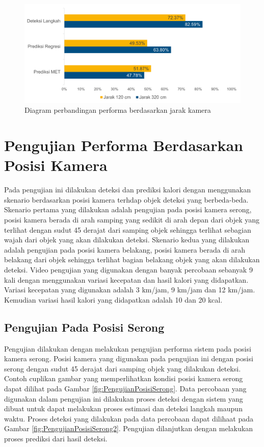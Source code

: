 \begin{figure}[H]
  \centering
  \includegraphics[scale=0.7]{gambar/diagram_jarak.png}
  \caption{Diagram perbandingan performa berdasarkan jarak kamera}
  \label{fig:DiagramJarak}
\end{figure}

\section{Pengujian Performa Berdasarkan Posisi Kamera}
\label{sec:PengujianPosisi}

Pada pengujian ini dilakukan deteksi dan prediksi kalori dengan menggunakan skenario berdasarkan posisi kamera terhdap objek deteksi yang berbeda-beda. Skenario pertama yang dilakukan adalah pengujian pada posisi kamera serong, posisi kamera berada di arah samping yang sedikit di arah depan dari objek yang terlihat dengan sudut 45 derajat dari samping objek sehingga terlihat sebagian wajah dari objek yang akan dilakukan deteksi. Skenario kedua yang dilakukan adalah pengujian pada posisi kamera belakang, posisi kamera berada di arah belakang dari objek sehingga terlihat bagian belakang objek yang akan dilakukan deteksi. Video pengujian yang digunakan dengan banyak percobaan sebanyak 9 kali dengan menggunakan variasi kecepatan dan hasil kalori yang didapatkan. Variasi kecepatan yang digunakan adalah 3 km/jam, 9 km/jam dan 12 km/jam. Kemudian variasi hasil kalori yang didapatkan adalah 10 dan 20 kcal. 


\subsection{Pengujian Pada Posisi Serong}
\label{subsec:PengujianPosisiSerong}

Pengujian dilakukan dengan melakukan pengujian performa sistem pada posisi kamera serong. Posisi kamera yang digunakan pada pengujian ini dengan posisi serong dengan sudut 45 derajat dari samping objek yang dilakukan deteksi. Contoh cuplikan gambar yang memperlihatkan kondisi posisi kamera serong dapat dilihat pada Gambar \ref{fig:PengujianPosisiSerong}. Data percobaan yang digunakan dalam pengujian ini dilakukan proses deteksi dengan sistem yang dibuat untuk dapat melakukan proses estimasi dan deteksi langkah maupun waktu. Proses deteksi yang dilakukan pada data percobaan dapat dilihaat pada Gambar \ref{fig:PengujianPosisiSerong2}. Pengujian dilanjutkan dengan melakukan proses prediksi dari hasil deteksi.



